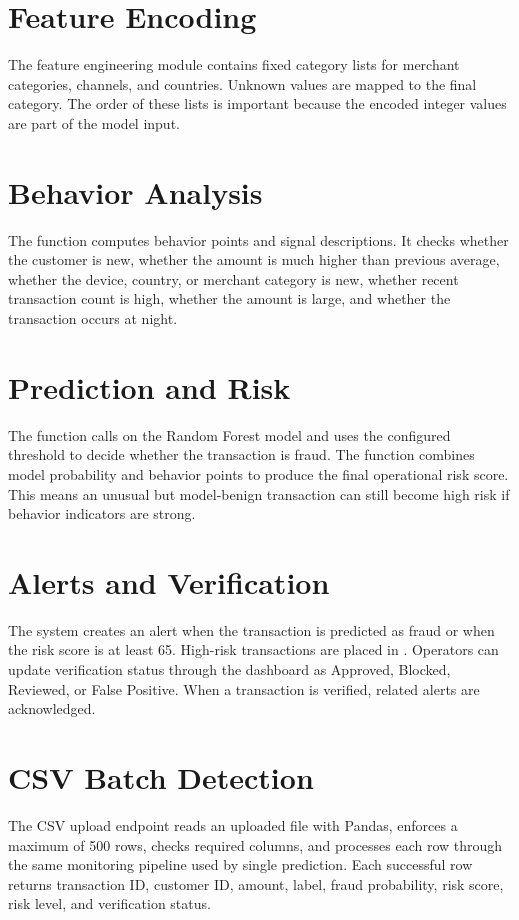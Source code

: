 \documentclass[12pt,a4paper]{report}
\begin{document}
\section{Feature Encoding}
The feature engineering module contains fixed category lists for merchant categories, channels, and countries. Unknown values are mapped to the final  category. The order of these lists is important because the encoded integer values are part of the model input.

\section{Behavior Analysis}
The function  computes behavior points and signal descriptions. It checks whether the customer is new, whether the amount is much higher than previous average, whether the device, country, or merchant category is new, whether recent transaction count is high, whether the amount is large, and whether the transaction occurs at night.

\section{Prediction and Risk}
The  function calls  on the Random Forest model and uses the configured threshold to decide whether the transaction is fraud. The  function combines model probability and behavior points to produce the final operational risk score. This means an unusual but model-benign transaction can still become high risk if behavior indicators are strong.

\section{Alerts and Verification}
The system creates an alert when the transaction is predicted as fraud or when the risk score is at least 65. High-risk transactions are placed in . Operators can update verification status through the dashboard as Approved, Blocked, Reviewed, or False Positive. When a transaction is verified, related alerts are acknowledged.

\section{CSV Batch Detection}
The CSV upload endpoint reads an uploaded file with Pandas, enforces a maximum of 500 rows, checks required columns, and processes each row through the same monitoring pipeline used by single prediction. Each successful row returns transaction ID, customer ID, amount, label, fraud probability, risk score, risk level, and verification status.
\end{document}
